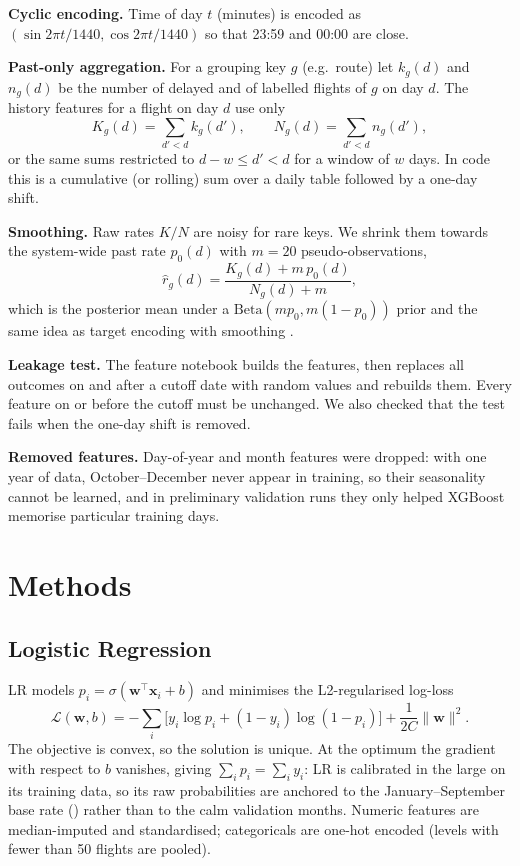 \documentclass[conference]{IEEEtran}
\begin{document}
\textbf{Cyclic encoding.} Time of day $t$ (minutes) is encoded as
$(\sin 2\pi t/1440, \cos 2\pi t/1440)$ so that 23:59 and 00:00 are close.

\textbf{Past-only aggregation.} For a grouping key $g$ (e.g.\ route) let $k_g(d)$ and
$n_g(d)$ be the number of delayed and of labelled flights of $g$ on day $d$. The
history features for a flight on day $d$ use only
\begin{equation}
K_g(d) = \sum_{d' < d} k_g(d'), \qquad N_g(d) = \sum_{d' < d} n_g(d'),
\end{equation}
or the same sums restricted to $d-w \le d' < d$ for a window of $w$ days. In code this
is a cumulative (or rolling) sum over a daily table followed by a one-day shift.

\textbf{Smoothing.} Raw rates $K/N$ are noisy for rare keys. We shrink them towards the
system-wide past rate $p_0(d)$ with $m=20$ pseudo-observations,
\begin{equation}
\hat r_g(d) = \frac{K_g(d) + m\, p_0(d)}{N_g(d) + m},
\end{equation}
which is the posterior mean under a $\mathrm{Beta}(m p_0, m(1-p_0))$ prior and the
same idea as target encoding with smoothing \cite{micci2001}.

\textbf{Leakage test.} The feature notebook builds the features, then replaces
all outcomes on and after a cutoff date with random values and rebuilds them. Every
feature on or before the cutoff must be unchanged. We also checked that the test fails
when the one-day shift is removed.

\textbf{Removed features.} Day-of-year and month features were dropped: with one year of
data, October--December never appear in training, so their seasonality cannot be
learned, and in preliminary validation runs they only helped XGBoost memorise
particular training days.

\section{Methods}
\subsection{Logistic Regression}
LR models $p_i = \sigma(\mathbf{w}^\top \mathbf{x}_i + b)$ and minimises the
L2-regularised log-loss
\begin{equation}
\mathcal{L}(\mathbf{w}, b) = -\sum_i \big[y_i \log p_i + (1-y_i)\log(1-p_i)\big] + \frac{1}{2C}\lVert\mathbf{w}\rVert^2 .
\end{equation}
The objective is convex, so the solution is unique. At the optimum the gradient with
respect to $b$ vanishes, giving $\sum_i p_i = \sum_i y_i$: LR is calibrated in the large
on its training data, so its raw probabilities are anchored to the January--September
base rate (\TrainRate) rather than to the calm validation months. Numeric features are median-imputed and standardised; categoricals are
one-hot encoded (levels with fewer than 50 flights are pooled).
\end{document}
